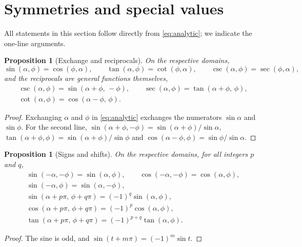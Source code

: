 \documentclass[11pt]{amsart}
\newtheorem{prop}[thm]{Proposition}
\theoremstyle{definition}
\theoremstyle{remark}
\numberwithin{equation}{section}
\begin{document}
\section{Symmetries and special values}
\label{sec:identities}

All statements in this section follow directly from \eqref{eq:analytic};
we indicate the one-line arguments.

\begin{prop}[Exchange and reciprocals]
\label{prop:exchange}
On the respective domains,
\[
\sin(\alpha,\phi) = \cos(\phi,\alpha), \qquad
\tan(\alpha,\phi) = \cot(\phi,\alpha), \qquad
\csc(\alpha,\phi) = \sec(\phi,\alpha),
\]
and the reciprocals are general functions themselves,
\begin{gather*}
\csc(\alpha,\phi) = \sin(\alpha+\phi,\,-\phi), \qquad
\sec(\alpha,\phi) = \tan(\alpha+\phi,\,\phi), \\
\cot(\alpha,\phi) = \cos(\alpha-\phi,\,\phi).
\end{gather*}
\end{prop}

\begin{proof}
Exchanging $\alpha$ and $\phi$ in \eqref{eq:analytic} exchanges the
numerators $\sin\alpha$ and $\sin\phi$. For the second line,
$\sin(\alpha+\phi,-\phi) = \sin(\alpha+\phi)/\sin\alpha$,
$\tan(\alpha+\phi,\phi) = \sin(\alpha+\phi)/\sin\phi$ and
$\cos(\alpha-\phi,\phi) = \sin\phi/\sin\alpha$.
\end{proof}

\begin{prop}[Signs and shifts]
\label{prop:symmetry}
On the respective domains, for all integers $p$ and $q$,
\begin{gather*}
\sin(-\alpha,-\phi) = \sin(\alpha,\phi), \qquad
\cos(-\alpha,-\phi) = \cos(\alpha,\phi), \\
\sin(-\alpha,\phi) = \sin(\alpha,-\phi), \\
\sin(\alpha+p\pi,\,\phi+q\pi) = (-1)^q\sin(\alpha,\phi), \\
\cos(\alpha+p\pi,\,\phi+q\pi) = (-1)^p\cos(\alpha,\phi), \\
\tan(\alpha+p\pi,\,\phi+q\pi) = (-1)^{p+q}\tan(\alpha,\phi).
\end{gather*}
\end{prop}

\begin{proof}
The sine is odd, and $\sin(t + m\pi) = (-1)^m \sin t$.
\end{proof}
\end{document}
